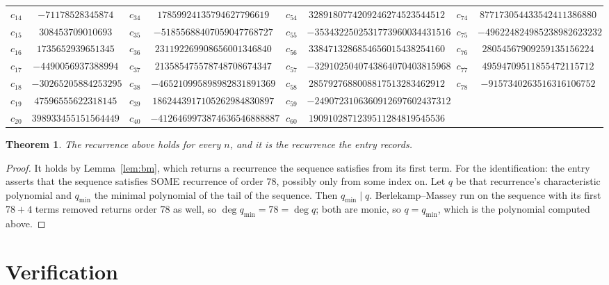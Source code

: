 \documentclass[11pt,a4paper]{article}
\theoremstyle{plain}
\newtheorem{theorem}{Theorem}
\theoremstyle{definition}
\begin{document}
\begin{center}
\begin{tabular}{cccccccc}
$c_{14}$ & $-71178528345874$ & $c_{34}$ & $17859924135794627796619$ & $c_{54}$ & $3289180774209246274523544512$ & $c_{74}$ & $877173054433542411386880$ \\
$c_{15}$ & $308453709010693$ & $c_{35}$ & $-51855688407059047768727$ & $c_{55}$ & $-3534322502531773960034431516$ & $c_{75}$ & $-496224824985238982623232$ \\
$c_{16}$ & $1735652939651345$ & $c_{36}$ & $231192269908656001346840$ & $c_{56}$ & $3384713286854656015438254160$ & $c_{76}$ & $28054567909259135156224$ \\
$c_{17}$ & $-4490056937388994$ & $c_{37}$ & $213585475578748708674347$ & $c_{57}$ & $-3291025040743864070403815968$ & $c_{77}$ & $49594709511855472115712$ \\
$c_{18}$ & $-30265205884253295$ & $c_{38}$ & $-465210995898982831891369$ & $c_{58}$ & $2857927688008817513283462912$ & $c_{78}$ & $-9157340263516316106752$ \\
$c_{19}$ & $47596555622318145$ & $c_{39}$ & $1862443917105262984830897$ & $c_{59}$ & $-2490723106360912697602437312$ &  &  \\
$c_{20}$ & $398933455151564449$ & $c_{40}$ & $-4126469973874636546888887$ & $c_{60}$ & $1909102871239511284819545536$ &  &  \\
\end{tabular}
\end{center}

\begin{theorem}
The recurrence above holds for every $n$, and it is the recurrence the entry records.
\end{theorem}

\begin{proof}
It holds by Lemma~\ref{lem:bm}, which returns a recurrence the sequence satisfies from its
first term. For the identification: the entry asserts that the sequence satisfies SOME
recurrence of order $78$, possibly only from some index on. Let $q$ be that recurrence's
characteristic polynomial and $q_{\min}$ the minimal polynomial of the tail of the sequence.
Then $q_{\min}\mid q$. Berlekamp--Massey run on the sequence with its first $78+4$ terms
removed returns order $78$ as well, so $\deg q_{\min}=78=\deg q$; both are monic, so
$q=q_{\min}$, which is the polynomial computed above.
\end{proof}

\section{Verification}
\end{document}
